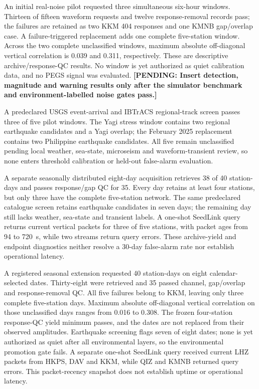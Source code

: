 \documentclass[11pt]{article}
\newcommand{\PEGSPending}[1]{\textbf{[PENDING: #1]}}
\begin{document}
An initial real-noise pilot requested three simultaneous six-hour windows.
Thirteen of fifteen waveform requests and twelve response-removal records pass;
the failures are retained as two KKM 404 responses and one KMNB gap/overlap
case. A failure-triggered replacement adds one complete five-station window.
Across the two complete unclassified windows, maximum absolute off-diagonal
vertical correlation is 0.039 and 0.311, respectively. These are descriptive
archive/response-QC results. No window is yet authorized as quiet calibration
data, and no PEGS signal was evaluated. \PEGSPending{Insert detection, magnitude
and warning results only after the simulator benchmark and environment-labelled
noise gates pass.}

A predeclared USGS event-arrival and IBTrACS regional-track screen passes three
of five pilot windows. The Yagi stress window contains two regional earthquake
candidates and a Yagi overlap; the February 2025 replacement contains two
Philippine earthquake candidates. All five remain unclassified pending local
weather, sea-state, microseism and waveform-transient review, so none enters
threshold calibration or held-out false-alarm evaluation.

A separate seasonally distributed eight-day acquisition retrieves 38 of 40
station-days and passes response/gap QC for 35. Every day retains at least four
stations, but only three have the complete five-station network. The same
predeclared catalogue screen retains earthquake candidates in seven days; the
remaining day still lacks weather, sea-state and transient labels. A one-shot
SeedLink query returns current vertical packets for three of five stations, with
packet ages from 94 to 720~s, while two streams return query errors. These
archive-yield and endpoint diagnostics neither resolve a 30-day false-alarm
rate nor establish operational latency.

A registered seasonal extension requested 40 station-days on eight
calendar-selected dates. Thirty-eight were retrieved and 35 passed channel,
gap/overlap and response-removal QC. All five failures belong to KKM, leaving
only three complete five-station days. Maximum absolute off-diagonal vertical
correlation on those unclassified days ranges from 0.016 to 0.308. The frozen
four-station response-QC yield minimum passes, and the dates are not replaced
from their observed amplitudes. Earthquake screening flags seven of eight
dates; none is yet authorized as quiet after all environmental layers, so the
environmental promotion gate fails. A separate
one-shot SeedLink query received current
LHZ packets from HKPS, DAV and KKM, while QIZ and KMNB returned query errors.
This packet-recency snapshot does not establish uptime or operational latency.
\end{document}

